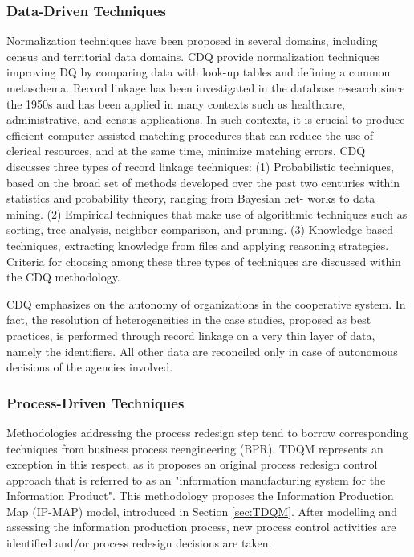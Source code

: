 \documentclass[pdftex,english,oribibl]{llncs}
\begin{document}
\subsubsection{Data-Driven Techniques}
Normalization techniques have been proposed in several domains, including census and territorial data domains.
CDQ provide normalization techniques improving DQ by comparing data with look-up tables and defining a common metaschema.
Record linkage has been investigated in the database research since the 1950s and has been applied in many contexts such as healthcare, administrative, and census applications.
In such contexts, it is crucial to produce efficient computer-assisted matching procedures that can reduce the use of clerical resources, and at the same time, minimize matching errors.
CDQ discusses three types of record linkage techniques:
(1) Probabilistic techniques, based on the broad set of methods developed over the past two centuries within statistics and probability theory, ranging from Bayesian net- works to data mining.
(2) Empirical techniques that make use of algorithmic techniques such as sorting, tree analysis, neighbor comparison, and pruning.
(3) Knowledge-based techniques, extracting knowledge from files and applying reasoning strategies.
Criteria for choosing among these three types of techniques are discussed within the CDQ methodology.

CDQ emphasizes on the autonomy of organizations in the cooperative system.
In fact, the resolution of heterogeneities in the case studies, proposed as best practices, is performed through record linkage on a very thin layer of data, namely the identifiers.
All other data are reconciled only in case of autonomous decisions of the agencies involved.
\subsubsection{Process-Driven Techniques}
Methodologies addressing the process redesign step tend to borrow corresponding techniques from business process reengineering (BPR).
TDQM represents an exception in this respect, as it proposes an original process redesign control approach that is referred to as an "information manufacturing system for the Information Product".
This methodology proposes the Information Production Map (IP-MAP) model, introduced in Section \ref{sec:TDQM}.
After modelling and assessing the information production process, new process control activities are identified and/or process redesign decisions are taken.
\end{document}
